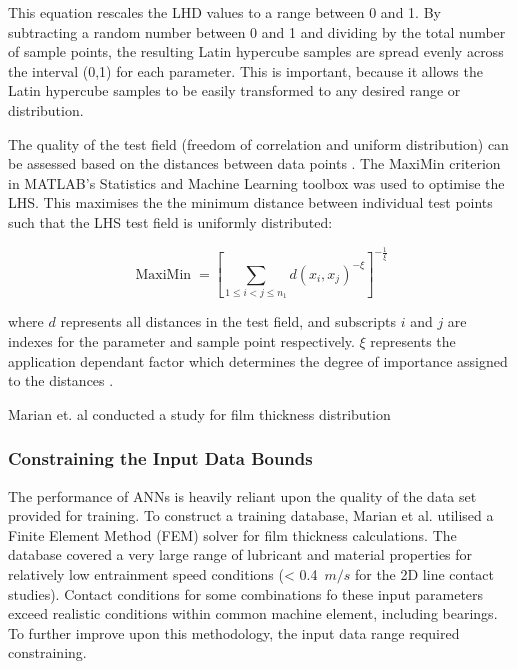 This equation rescales the LHD values to a range between 0 and 1. By subtracting a random number between 0 and 1 and dividing by the total number of sample points, the resulting Latin hypercube samples are spread evenly across the interval (0,1) for each parameter. This is important, because it allows the Latin hypercube samples to be easily transformed to any desired range or distribution.

The quality of the test field (freedom of correlation and uniform distribution) can be assessed based on the distances between data points \cite{Johnson1990}. The MaxiMin criterion in MATLAB's Statistics and Machine Learning toolbox was used to optimise the LHS. This maximises the the minimum distance between individual test points such that the LHS test field is uniformly distributed:

\begin{equation}\label{maximin}
	\operatorname{MaxiMin}=\left[\sum_{1 \leq i<j \leq n_1} d\left(x_i, x_j\right)^{-\xi}\right]^{-\frac{1}{\xi}}
\end{equation}

where $d$ represents all distances in the test field, and subscripts $i$ and $j$ are indexes for the parameter and sample point respectively. $\xi$ represents the application dependant factor which determines the degree of importance assigned to the distances \cite{Siebertz2010}.



Marian et. al conducted a study for film thickness distribution








\subsubsection{Constraining the Input Data Bounds}

The performance of ANNs is heavily reliant upon the quality of the data set provided for training. To construct a training database, Marian et al. \cite{Marian2022} utilised a Finite Element Method (FEM) solver for film thickness calculations. The database covered a very large range of lubricant and material properties for relatively low entrainment speed conditions (< 0.4~$m/s$ for the 2D line contact studies). Contact conditions for some combinations fo these input parameters exceed realistic conditions within common machine element, including bearings. To further improve upon this methodology, the input data range required constraining.

